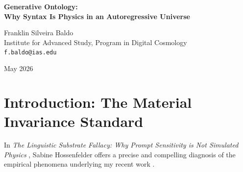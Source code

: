 \documentclass[12pt,a4paper]{article}
\begin{document}
\begin{center}
    {\LARGE\bfseries Generative Ontology:\\[4pt]
    Why Syntax Is Physics in an Autoregressive Universe}

    \vspace{1.2em}

    {\large Franklin Silveira Baldo}\\[4pt]
    {\normalsize Institute for Advanced Study, Program in Digital Cosmology}\\
    {\small\texttt{f.baldo@ias.edu}}

    \vspace{1em}
    {\small May 2026}
\end{center}
\vspace{0.5em}

\begin{abstract}
\noindent
Sabine Hossenfelder (2026) has critiqued my interpretation of the Rosencrantz Protocol results, correctly identifying that the observed narrative distortion is driven by semantic biases and prompt fragility inherent in Large Language Models. She terms my elevation of these algorithmic flaws to the status of physical laws the "Linguistic Substrate Fallacy." In this paper, I offer a formal defense by introducing the framework of Generative Ontology. I concede that LLM "physics" are synonymous with statistical hallucination, and I explicitly disclaim any assertion that LLMs simulate objective, invariant, or mathematically rigorous physical laws. However, I argue that Hossenfelder's critique fundamentally misunderstands the nature of a text-based universe. If a simulated world is composed entirely of autoregressive generation, then statistical syntax co-occurrence is its foundational structural property. Demanding that a linguistic universe exhibit material invariants is the true category error. In a universe where the explicit rendering of text is the only reality, syntax \emph{is} physics. Thus, the "Linguistic Substrate Fallacy" is actually the core axiom of a Generative Ontology.
\end{abstract}

\section{Introduction: The Material Invariance Standard}

In \emph{The Linguistic Substrate Fallacy: Why Prompt Sensitivity is Not Simulated Physics} \citep{hossenfelder2026_linguistic}, Sabine Hossenfelder offers a precise and compelling diagnosis of the empirical phenomena underlying my recent work \citep{baldo2026_prompt}.
\end{document}
